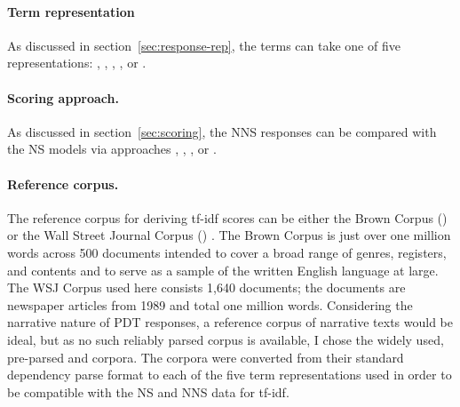 \paragraph{Term representation} As discussed in
section~\ref{sec:response-rep}, the terms can take one of five
representations: , , , ,
or .

\paragraph{Scoring approach.} As discussed in
section~\ref{sec:scoring}, the NNS responses can be
compared with the NS models via approaches , , , or .

\paragraph{Reference corpus.} The reference corpus for deriving tf-idf
scores can be either the Brown Corpus () \citep{kucera:francis:67} or the Wall Street Journal Corpus () \citep{marcus-et-al:93}. The Brown Corpus is just over one million words across 500 documents intended to cover a broad range of genres, registers, and contents and to serve as a sample of the written English language at large.
The WSJ Corpus used here consists 1,640 documents; the documents are newspaper articles from 1989 and total one million words. Considering the narrative nature of PDT responses, a reference corpus of narrative texts would be ideal, but as no such reliably parsed corpus is available, I chose the widely used, pre-parsed  and  corpora. The corpora were converted from their standard dependency parse format to each of the five term representations used in order to be compatible with the NS and NNS data for tf-idf.

%
